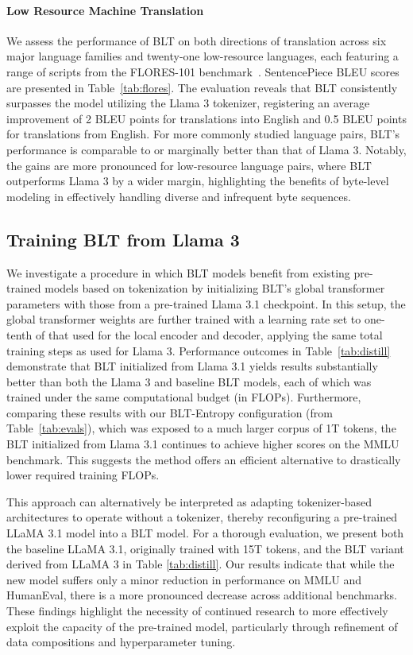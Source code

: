 \paragraph{Low Resource Machine Translation} We assess the performance of {\textsc BLT} on both directions of translation across six major language families and twenty-one low-resource languages, each featuring a range of scripts from the FLORES-101 benchmark~\citep{goyal2022flores}. SentencePiece BLEU scores are presented in Table~\ref{tab:flores}. The evaluation reveals that {\textsc BLT} consistently surpasses the model utilizing the Llama 3 tokenizer, registering an average improvement of 2 BLEU points for translations into English and 0.5 BLEU points for translations from English. For more commonly studied language pairs, {\textsc BLT}'s performance is comparable to or marginally better than that of Llama 3. Notably, the gains are more pronounced for low-resource language pairs, where {\textsc BLT} outperforms Llama 3 by a wider margin, highlighting the benefits of byte-level modeling in effectively handling diverse and infrequent byte sequences.

\subsection{Training {\textsc BLT} from Llama 3}
\label{sec:distillation}
We investigate a procedure in which {\textsc BLT} models benefit from existing pre-trained models based on tokenization by initializing {\textsc BLT}'s global transformer parameters with those from a pre-trained Llama 3.1 checkpoint. In this setup, the global transformer weights are further trained with a learning rate set to one-tenth of that used for the local encoder and decoder, applying the same total training steps as used for Llama 3. Performance outcomes in Table~\ref{tab:distill} demonstrate that {\textsc BLT} initialized from Llama 3.1 yields results substantially better than both the Llama 3 and baseline {\textsc BLT} models, each of which was trained under the same computational budget (in FLOPs). Furthermore, comparing these results with our {\textsc BLT}-Entropy configuration (from Table~\ref{tab:evals}), which was exposed to a much larger corpus of 1T tokens, the {\textsc BLT} initialized from Llama 3.1 continues to achieve higher scores on the MMLU benchmark. This suggests the method offers an efficient alternative to drastically lower required training FLOPs.

This approach can alternatively be interpreted as adapting tokenizer-based architectures to operate without a tokenizer, thereby reconfiguring a pre-trained LLaMA 3.1 model into a {\textsc BLT} model. For a thorough evaluation, we present both the baseline LLaMA 3.1, originally trained with 15T tokens, and the {\textsc BLT} variant derived from LLaMA 3 in Table \ref{tab:distill}. Our results indicate that while the new model suffers only a minor reduction in performance on MMLU and HumanEval, there is a more pronounced decrease across additional benchmarks. These findings highlight the necessity of continued research to more effectively exploit the capacity of the pre-trained model, particularly through refinement of data compositions and hyperparameter tuning.

